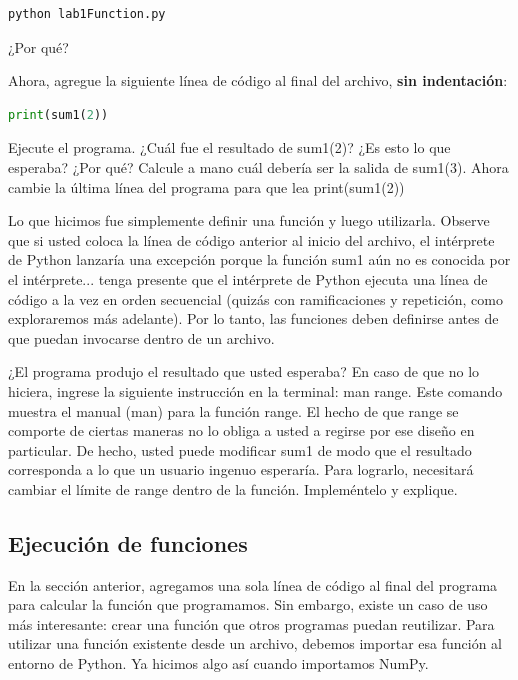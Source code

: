 \begin{lstlisting}[language=Python]
	python lab1Function.py
\end{lstlisting}

¿Por qué? \QA

Ahora, agregue la siguiente línea de código al final del archivo, \textbf{sin indentación}:

\begin{lstlisting}[language=Python]
print(sum1(2))
\end{lstlisting}

Ejecute el programa. ¿Cuál fue el resultado de {\s sum1(2)}? ¿Es esto lo que esperaba? ¿Por qué? \QA Calcule a mano cuál debería ser la salida de {\s sum1(3)}. Ahora cambie la última línea del programa para que lea {\s print(sum1(2))}

Lo que hicimos fue simplemente definir una función y luego utilizarla. Observe que si usted coloca la línea de código anterior al inicio del archivo, el intérprete de Python lanzaría una excepción porque la función {\s sum1} aún no es conocida por el intérprete... tenga presente que el intérprete de Python ejecuta una línea de código a la vez en orden secuencial (quizás con ramificaciones y repetición, como exploraremos más adelante). Por lo tanto, las funciones deben definirse antes de que puedan invocarse dentro de un archivo.

¿El programa {\s } produjo el resultado que usted esperaba? En caso de que no lo hiciera, ingrese la siguiente instrucción en la terminal: {\s man range}. Este comando muestra el manual ({\s man}) para la función {\s range}. El hecho de que {\s range} se comporte de ciertas maneras no lo obliga a usted a regirse por ese diseño en particular. De hecho, usted puede modificar {\s sum1} de modo que el resultado corresponda a lo que un usuario ingenuo esperaría. Para lograrlo, necesitará cambiar el límite de range dentro de la función. Impleméntelo y explique. \QA

\subsection{Ejecución de funciones}

En la sección anterior, agregamos una sola línea de código al final del programa para calcular la función que programamos. Sin embargo, existe un caso de uso más interesante: crear una función que otros programas puedan reutilizar. Para utilizar una función existente desde un archivo, debemos importar esa función al entorno de Python. Ya hicimos algo así cuando importamos NumPy.

